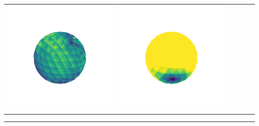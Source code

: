 \begin{center}
\begin{tabularx}{\linewidth}{@{}Y@{}Y@{}Y@{}Y@{}Y@{}Y@{}}
\includegraphics[width=\linewidth]{semisynthetic/20150514_1_marrnet_err.png} &
\includegraphics[width=\linewidth]{semisynthetic/20150514_1_ef_err.png} \\
\end{tabularx}
\begin{center}\rule{0.5\linewidth}{\linethickness}\end{center}


\end{center}

